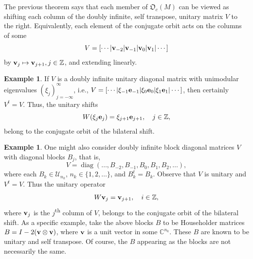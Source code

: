 \documentclass{dis}
\theoremstyle{plain}
\theoremstyle{definition}
\newtheorem{Example}[equation]{Example}
\def\C{\mathbb{C}}
\def\Z{\mathbb{Z}}
\renewcommand{\vec}[1]{{\bf #1}}
\newcommand{\0}{{\color{lightgray}0}}
\begin{document}
The previous theorem says that each member of $\mathfrak{O}_c(M)$ can be viewed as shifting each column of the doubly infinite, self transpose, unitary matrix $V$ to the right. Equivalently, each element of the conjugate orbit  acts on the  columns of some 
$$V = [\cdots|\vec{v}_{-2} |\vec{v}_{-1} |\vec{v}_0 | \vec{v}_1| \cdots]$$
by $\vec{v}_{j} \mapsto \vec{v}_{j + 1}, j \in \Z$, and extending linearly. 


\begin{Example}
If $V$ is a doubly infinite unitary diagonal matrix with unimodular eigenvalues $(\xi_{j})_{j = -\infty}^{\infty}$, i.e., 
$V = [\cdots|\xi_{-1} \vec{e}_{-1}|\xi_{0} \vec{e}_0|\xi_{1} \vec{e}_1|\cdots]$, then certainly $V^{t} = V$. Thus, the unitary shifts
$$W (\xi_{j} \vec{e}_j) = \xi_{j + 1} \vec{e}_{j + 1}, \quad j \in \Z,$$
belong to the conjugate orbit of the bilateral shift.
\end{Example}

\begin{Example}
One might also consider doubly infinite block diagonal matrices $V$ with diagonal blocks $B_{j}$, that is, 
$$V = \operatorname{diag}(\ldots, B_{-2}, B_{-1}, B_{0}, B_{1}, B_{2}, \ldots),$$
where each $B_k \in \mathscr{U}_{n_k}$, $n_k  \in \{1, 2, \ldots\}$, and $B_{k}^{t} = B_{k}$.  Observe that $V$ is unitary and $V^{t} = V$. Thus the unitary operator
$$W \vec{v}_j = \vec{v}_{j + 1}, \quad i \in \Z,$$
where $\vec{v}_j$ is the $j$\textsuperscript{th} column of $V$, belongs to the conjugate orbit of the bilateral shift.
As a specific example, take the above  blocks $B$ to be  Householder matrices $B= I  - 2 (\vec{v} \otimes \vec{v})$, where $\vec{v}$ is a unit vector in some $\C^{n_k}$. These $B$ are known to be unitary and self transpose. Of course, the $B$ appearing as the blocks are not necessarily the same. 
\end{Example}
\end{document}
